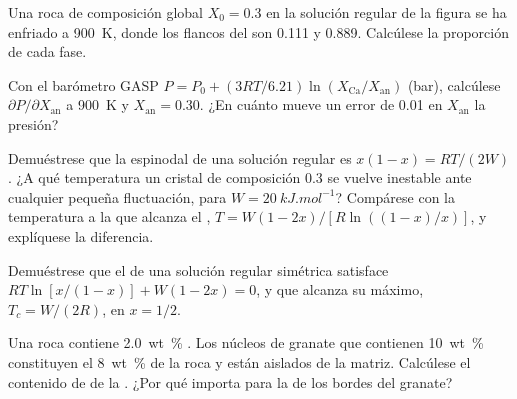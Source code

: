 \begin{exercise}[$\star\star$]\label{exo:b3:petrological-thermodynamics:8}
Una roca de composición global $X_0 = 0.3$ en la solución regular de la figura
se ha enfriado a \qty{900}{K}, donde los flancos del  son 0.111 y 0.889.
Calcúlese la proporción de cada fase.
\end{exercise}

\begin{exercise}[$\star\star$]\label{exo:b3:petrological-thermodynamics:9}
Con el barómetro GASP $P = P_0 + (3RT/6.21)\ln(X_{\text{Ca}}/X_{\text{an}})$
(bar), calcúlese $\partial P/\partial X_{\text{an}}$ a \qty{900}{K} y
$X_{\text{an}} = 0.30$. ¿En cuánto mueve un error de 0.01 en $X_{\text{an}}$
la presión?
\end{exercise}

\begin{exercise}[$\star\star\star$]\label{exo:b3:petrological-thermodynamics:10}
Demuéstrese que la espinodal de una solución regular es $x(1 - x) = RT/(2W)$. ¿A qué
temperatura un cristal de composición 0.3 se vuelve inestable ante cualquier pequeña
fluctuación, para $W = \qty{20}{kJ.mol^{-1}}$? Compárese con la temperatura a la que
alcanza el , $T = W(1 - 2x)/[R\ln((1 - x)/x)]$, y explíquese la
diferencia.
\end{exercise}

\begin{exercise}[$\star\star\star$]\label{exo:b3:petrological-thermodynamics:11}
Demuéstrese que el  de una solución regular simétrica satisface $RT\ln[x/(1 -
x)] + W(1 - 2x) = 0$, y que alcanza su máximo, $T_c = W/(2R)$, en $x
= 1/2$.
\end{exercise}

\begin{exercise}[$\star\star\star$]\label{exo:b3:petrological-thermodynamics:12}
Una roca contiene \qty{2.0}{wt\percent} . Los núcleos de granate que contienen
\qty{10}{wt\percent}  constituyen el \qty{8}{wt\percent} de la roca y están
aislados de la matriz. Calcúlese el contenido de  de la . ¿Por qué importa para la  de los bordes del granate?
\end{exercise}

